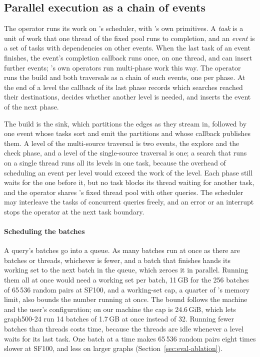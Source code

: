 \subsection{Parallel execution as a chain of events}
\label{sec:phases}

The operator runs its work on \duckdb's scheduler, with \duckdb's own primitives. A \duckdb \emph{task} is a unit
of work that one thread of the fixed pool runs to completion, and an \emph{event} is a set of tasks with dependencies
on other events. When the last task of an event finishes, the event's completion callback runs once, on one thread,
and can insert further events; \duckdb's own operators run multi-phase work this way. The operator runs the build
and both traversals as a chain of such events, one per phase. At the end of a level the callback of its last phase
records which searches reached their destinations, decides whether another level is needed, and inserts the event of
the next phase.

The build is the sink, which partitions the edges as they stream in, followed by one event whose tasks sort and
emit the partitions and whose callback publishes them. A level of the multi-source traversal is two events, the
explore and the check phase, and a level of the single-source traversal is one; a search that runs on a single thread
runs all its levels in one task, because the overhead of scheduling an event per level would exceed the work
of the level. Each phase still waits
for the one before it, but no task blocks its thread waiting for another task, and the operator shares \duckdb's
fixed thread pool with other queries. The scheduler may interleave the tasks of concurrent queries freely,
and an error or an interrupt stops the operator at the next task boundary.

\paragraph{Scheduling the batches} A query's batches go into a queue. As many batches run at once as there are
batches or threads, whichever is fewer, and a batch that finishes hands its working set to the next batch in the
queue, which zeroes it in parallel. Running them all at once would need a working set per batch, 11\,GB for the 256
batches of 65\,536 random pairs at SF100, and a working-set cap, a quarter of \duckdb's memory limit, also bounds
the number running at once. The bound follows the machine and the user's configuration; on our machine the cap
is 24.6\,GiB, which lets graph500-24 run 14 batches of 1.7\,GB at once instead of 32. Running fewer batches than threads
costs time, because the threads are idle whenever a level waits for its last task. One batch at a time makes 65\,536 random pairs eight times slower at SF100, and less on larger graphs (Section~\ref{sec:eval-ablation}).

